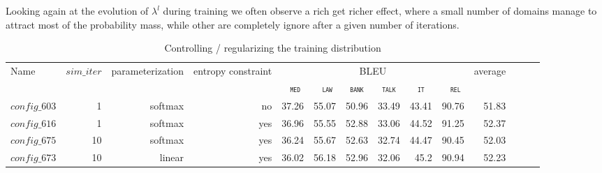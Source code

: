 \documentclass[11pt,a4paper]{article}
\newcommand{\fyTodo}[1]{\Todo[FY:]{\textcolor{orange}{#1}}}
\newcommand{\domain}[1]{\texttt{\textsc{#1}}}
\newcommand{\system}[1]{\texttt{{#1}}}
\begin{document}
Looking again at the evolution of $\lambda^l$ during training we often observe a rich get richer effect, where a small number of domains manage to attract most of the probability mass, while other are completely ignore after a given number of iterations.

\fyTodo{Explain issues}

\begin{table}
  \centering %
  \begin{adjustbox}{width=1.0\textwidth,center}
  \begin{tabular}{|p{2.0cm}|*{13}{r|}} \hline
    \multirow{2}{*}{Name} & \multirow{2}{*}{$sim\_iter$} & \multirow{2}{*}{parameterization} & \multirow{2}{*}{entropy constraint} & \multicolumn{6}{|c|}{BLEU} & \multirow{2}{*}{average} \\ \cline{5-10}	
   & & & & \multicolumn{1}{c|}{\domain{ med}} & \multicolumn{1}{c|}{\domain{ law}} & \multicolumn{1}{c|}{\domain{bank}} & \multicolumn{1}{c|}{\domain{talk}} & \multicolumn{1}{c|}{\domain{ it }} & \multicolumn{1}{c|}{\domain{ rel}} &  \\
    \hline
    \system{$config\_603$} & 1 & softmax & no & 37.26& 55.07& 50.96& 33.49& 43.41& 90.76& 51.83\\
    \system{$config\_616$} & 1 & softmax & yes & 36.96& 55.55& 52.88& 33.06& 44.52& 91.25& 52.37 \\
    \system{$config\_675$} & 10 & softmax & yes & 36.24& 55.67& 52.63& 32.74& 44.47& 90.45& 52.03\\
    \system{$config\_673$} & 10 & linear & yes & 36.02& 56.18& 52.96& 32.06& 45.2 & 90.94 & 52.23 \\
  \hline
  \end{tabular}
  \end{adjustbox}
  \caption{Controlling / regularizing the training distribution}
  \label{tab:performance}
\end{table}
\end{document}
